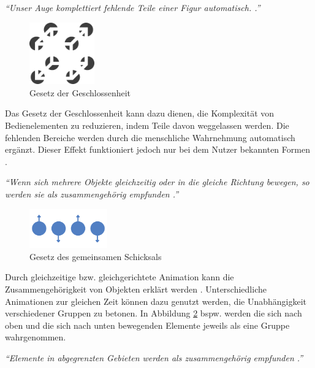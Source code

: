 \textit{\enquote{Unser Auge komplettiert fehlende Teile einer Figur automatisch. \cite[S. 187]{Moser2012}.}}\par
\begin{figure}[H]
 \centering
 \includegraphics[width=0.25\textwidth]{grafiken/geschlossenheit.png}
 \caption[Gesetz der Geschlossenheit]{Gesetz der Geschlossenheit \cite{WikiGestaltgesetze}}
 \label{fig:gesetzGeschloss}
\end{figure}
Das Gesetz der Geschlossenheit kann dazu dienen, die Komplexität von Bedienelementen zu reduzieren, indem Teile davon weggelassen werden. Die fehlenden Bereiche werden durch die menschliche Wahrnehmung automatisch ergänzt. Dieser Effekt funktioniert jedoch nur bei dem Nutzer bekannten Formen \cite{Moser2012}.\par
{}
\textit{\enquote{Wenn sich mehrere Objekte gleichzeitig oder in die gleiche Richtung bewegen, so werden sie als zusammengehörig empfunden \cite[S. 187]{Moser2012}.}}\par
\begin{figure}[H]
 \centering
 \includegraphics[width=0.2999\textwidth]{grafiken/schicksal.png}
 \caption{Gesetz des gemeinsamen Schicksals}
 \label{fig:gesetzSchicksal}
\end{figure}
Durch gleichzeitige bzw. gleichgerichtete Animation kann die Zusammengehörigkeit von Objekten erklärt werden \cite{Moser2012}. Unterschiedliche Animationen zur gleichen Zeit können dazu genutzt werden, die Unabhängigkeit verschiedener Gruppen zu betonen. In Abbildung \ref{fig:gesetzSchicksal} bspw. werden die sich nach oben und die sich nach unten bewegenden Elemente jeweils als eine Gruppe wahrgenommen.\par
{}
\textit{\enquote{Elemente in abgegrenzten Gebieten werden als zusammengehörig empfunden \newline\cite{WikiGestaltgesetze}.}}\par
